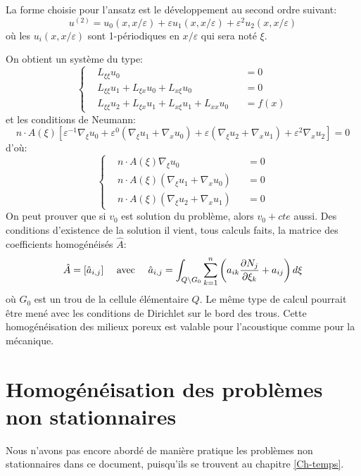 La forme choisie pour l'ansatz est le développement au second ordre suivant:
\begin{equation}u^{(2)} = u_0(x,x/\varepsilon)+\varepsilon u_1(x,x/\varepsilon) + \varepsilon^2 u_2(x,x/\varepsilon)\end{equation}
où les $u_i(x,x/\varepsilon)$ sont 1-périodiques en $x/\varepsilon$ qui sera noté $\xi$.

On obtient un système du type:
\begin{equation}\left\{
\begin{aligned}
&L_{\xi\xi} u_0 &&=0\\
&L_{\xi\xi}u_1+L_{\xi x}u_0+L_{x\xi}u_0 &&=0\\
&L_{\xi\xi}u_2+L_{\xi x}u_1+L_{x\xi}u_1 +L_{xx}u_0 &&=f(x)
\end{aligned}
\right. \end{equation}
et les conditions de Neumann:
\begin{equation} n\cdot A(\xi)\left[ \varepsilon^{-1}\nabla_\xi u_0 + \varepsilon^0 (\nabla_\xi u_1+\nabla_x u_0) +
\varepsilon(\nabla_\xi u_2+\nabla_x u_1)+\varepsilon^2\nabla_x u_2
\right]=0 \end{equation}
d'où:
\begin{equation}\left\{
\begin{aligned}
&n\cdot A(\xi)\nabla_\xi u_0 &&=0\\
&n\cdot A(\xi) (\nabla_\xi u_1+\nabla_x u_0) &&=0\\
&n\cdot A(\xi)(\nabla_\xi u_2+\nabla_x u_1) &&=0
\end{aligned}
\right. \end{equation}
On peut prouver que si $v_0$ est solution du problème, alors $v_0+cte$ aussi.
\medskip
Des conditions d'existence de la solution il vient, tous calculs faits, la matrice des
coefficients homogénéisés $\hat{A}$:
\begin{equation} \hat{A} = [\hat{a}_{i,j} ]
\quad \text{ avec }
\quad
\hat{a}_{i,j}=\displaystyle\int_{Q\backslash G_0} \displaystyle\sum_{k=1}^n \left(a_{ik} \frac{\partial N_j}{\partial\xi_k} + a_{ij}
\right) d\xi
\end{equation}
où $G_0$ est un trou de la cellule élémentaire $Q$.
\medskip
Le même type de calcul pourrait être mené avec les conditions de Dirichlet sur le bord
des trous.
\medskip
Cette homogénéisation des milieux poreux est valable pour l'acoustique comme pour la mécanique.
\medskip
\section{Homogénéisation des problèmes non stationnaires}
Nous n'avons pas encore abordé de manière pratique les problèmes non stationnaires
dans ce document, puisqu'ils se trouvent au chapitre \ref{Ch-temps}.

